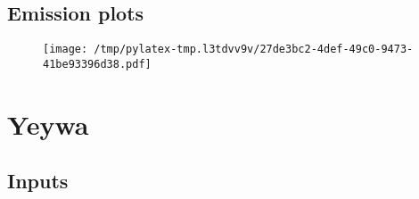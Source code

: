 \documentclass{article}%
\begin{document}
\subsection{Emission plots}%
\label{subsec:Emissionplots}%


\begin{figure}[htbp]%
\centering%
\texttt{[image: /tmp/pylatex-tmp.l3tdvv9v/27de3bc2-4def-49c0-9473-41be93396d38.pdf]}%
\end{figure}

%
\section{Yeywa}%
\label{sec:Yeywa}%
\subsection{Inputs}%
\label{subsec:Inputs}%
\end{document}

